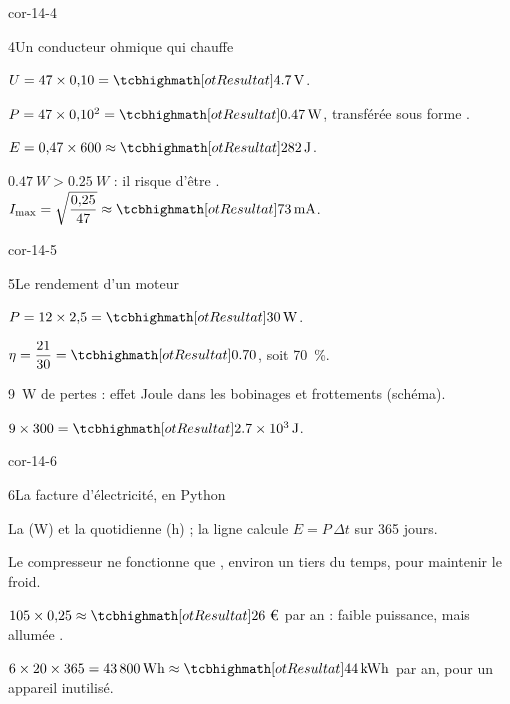 \begin{blocLivre}{cor-14-4}
\begin{corrige}{4}{Un conducteur ohmique qui chauffe}
\begin{questions}
\item $U=47\times0{,}10=\res{\qty{4,7}{V}}$.
\item $P=47\times0{,}10^2=\res{\qty{0,47}{W}}$, transférée sous forme .
\item $E=0{,}47\times600\approx\res{\qty{282}{J}}$.
\item $\qty{0,47}{W}>\qty{0,25}{W}$ : il risque d'être . $I_\mathrm{max}=\sqrt{\dfrac{0{,}25}{47}}\approx\res{\qty{73}{mA}}$.
\end{questions}
\end{corrige}
\end{blocLivre}
\begin{blocLivre}{cor-14-5}
\begin{corrige}{5}{Le rendement d'un moteur}
\begin{questions}
\item $P=12\times2{,}5=\res{\qty{30}{W}}$.
\item $\eta=\dfrac{21}{30}=\res{\num{0,70}}$, soit \qty{70}{\percent}.
\item \qty{9}{W} de pertes  : effet Joule dans les bobinages et frottements (schéma).
\item $9\times300=\res{\qty{2,7e3}{J}}$.
\end{questions}
\end{corrige}
\end{blocLivre}
\begin{blocLivre}{cor-14-6}
\begin{corrige}{6}{La facture d'électricité, en Python}
\begin{questions}
\item La  (W) et la  quotidienne (h) ; la ligne calcule $E=P\,\Delta t$ sur 365 jours.
\item Le compresseur ne fonctionne que , environ un tiers du temps, pour maintenir le froid.
\item $105\times0{,}25\approx\res{\text{26~€}}$ par an : faible puissance, mais allumée .
\item $6\times20\times365=\qty{43800}{Wh}\approx\res{\qty{44}{kWh}}$ par an, pour un appareil inutilisé.
\end{questions}
\end{corrige}
\end{blocLivre}
